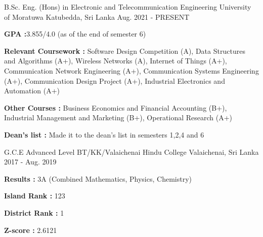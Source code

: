 

\begin{cventries}

\cventry
{B.Sc. Eng. (Hons) in Electronic and Telecommunication Engineering} %
{University of Moratuwa} %
{Katubedda, Sri Lanka} %
{Aug. 2021 - PRESENT} %
{ %
\begin{cvitems}
\item \textbf{GPA :}3.855/4.0 (as of the end of semester 6)
\item \textbf{Relevant Coursework :} Software Design Competition (A), Data Structures and Algorithms (A+), Wireless Networks (A), Internet of Things (A+), Communication Network Engineering (A+), Communication Systems Engineering (A+), Communication Design Project (A+), Industrial Electronics and Automation (A+)
\item \textbf{Other Courses :} Business Economics and Financial Accounting (B+), Industrial Management and Marketing (B+), Operational Research (A+)
\item \textbf{Dean's list :} Made it to the dean's list in semesters 1,2,4 and 6
\end{cvitems}
}

\cventry
{G.C.E Advanced Level} %
{BT/KK/Valaichenai Hindu College} %
{Valaichenai, Sri Lanka} %
{2017 - Aug. 2019} %
{ %
\begin{cvitems}
\item \textbf{Results :} 3A (Combined Mathematics, Physics, Chemistry)
\item \textbf{Island Rank :} 123
\item \textbf{District Rank :} 1
\item \textbf{Z-score :} 2.6121
\end{cvitems}
}

\end{cventries}
